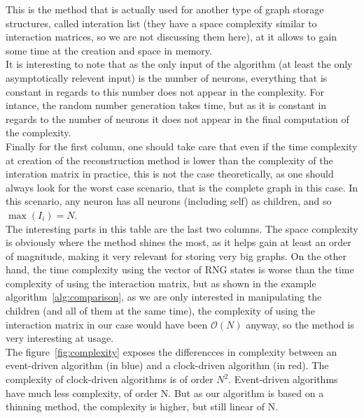 	This is the method that is actually used for another type of graph storage structures, called interation list (they have a space complexity similar to interaction matrices, so we are not discussing them here), at it allows to gain some time at the creation and space in memory.\\\indent
	It is interesting to note that as the only input of the algorithm (at least the only asymptotically relevent input) is the number of neurons, everything that is constant in regards to this number does not appear in the complexity. For intance, the random number generation takes time, but as it is constant in regards to the number of neurons it does not appear in the final computation of the complexity.\\\indent
	Finally for the first column, one should take care that even if the time complexity at creation of the reconstruction method is lower than the complexity of the interation matrix in practice, this is not the case theoretically, as one should always look for the worst case scenario, that is the complete graph in this case. In this scenario, any neuron has all neurons (including self) as children, and so $\max(I_i)=N$.\\\indent
	The interesting parts in this table are the last two columns. The space complexity is obviously where the method shines the most, as it helps gain at least an order of magnitude, making it very relevant for storing very big graphs. On the other hand, the time complexity using the vector of RNG states is worse than the time complexity of using the interaction matrix, but as shown in the example algorithm~\ref{alg:comparison}, as we are only interested in manipulating the children (and all of them at the same time), the complexity of using the interaction matrix in our case would have been $\mathscr{O}(N)$ anyway, so the method is very interesting at usage.\\\indent
	The figure~\ref{fig:complexity} exposes the differencces in complexity between an event-driven algorithm (in blue) and a clock-driven algorithm (in red). 
	The complexity of clock-driven algorithms is of order $N^2$. Event-driven algorithms have much less complexity, of order N. But as our algorithm is based on a thinning method, the complexity is higher, but still linear of N.\\
